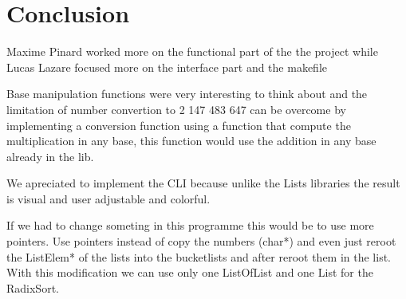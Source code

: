 \documentclass[book, backcover, english, nodocumentinfo]{upmethodology-document}
\begin{document}
\chapter{Conclusion} \label{chapter:Conclusion}
	Maxime Pinard worked more on the functional part of the the project while Lucas Lazare focused more on the interface part and the makefile

	Base manipulation functions were very interesting to think about and the limitation of number convertion to 2 147 483 647 can be overcome by implementing a conversion function using a function that compute the multiplication in any base, this function would use the addition in any base already in the lib.

	We apreciated to implement the CLI because unlike the Lists libraries the result is visual and user adjustable and colorful.

	If we had to change someting in this programme this would be to use more pointers.
	Use pointers instead of copy the numbers (char*) and even just reroot the ListElem* of the lists into the bucketlists and after reroot them in the list. With this modification we can use only one ListOfList and one List for the RadixSort.
\end{document}
